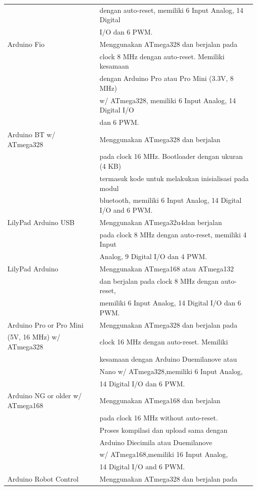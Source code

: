 \begin{table}[!ht]
\begin{tabular}{ |l|l| }
& dengan auto-reset, memiliki 6 Input Analog, 14 Digital \\
& I/O dan 6 PWM.\\
\hline
Arduino Fio & Menggunakan ATmega328 dan berjalan pada \\
& clock 8 MHz dengan auto-reset. Memiliki kesamaan \\ 
& dengan Arduino Pro atau Pro Mini (3.3V, 8 MHz) \\ 
& w/ ATmega328, memiliki 6 Input Analog, 14 Digital I/O \\ 
& dan 6 PWM.\\
\hline
Arduino BT w/ ATmega328 & Menggunakan ATmega328 dan berjalan \\
& pada clock 16 MHz. Bootloader dengan ukuran (4 KB) \\
& termasuk kode untuk melakukan inisialisasi pada modul \\
& bluetooth, memiliki 6 Input Analog, 14 Digital I/O and 6 PWM.\\
\hline
LilyPad Arduino USB & Menggunakan ATmega32u4dan berjalan \\
& pada clock 8 MHz dengan auto-reset, memiliki 4 Input \\
& Analog, 9 Digital I/O dan 4 PWM. \\
\hline
LilyPad Arduino & Menggunakan ATmega168 atau ATmega132 \\
& dan berjalan pada clock 8 MHz dengan auto-reset, \\
&memiliki 6 Input Analog, 14 Digital I/O dan 6 PWM. \\
\hline
Arduino Pro or Pro Mini & Menggunakan ATmega328 dan berjalan pada \\
(5V, 16 MHz) w/ ATmega328 & clock 16 MHz dengan auto-reset. Memiliki \\
 & kesamaan dengan Arduino Duemilanove atau \\
 & Nano w/ ATmega328,memiliki 6 Input Analog,\\
 & 14 Digital I/O dan 6 PWM. \\
\hline
Arduino NG or older w/ ATmega168 & Menggunakan ATmega168 dan berjalan \\
& pada clock 16 MHz without auto-reset. \\
& Proses kompilasi dan upload sama dengan \\
& Arduino Diecimila atau Duemilanove \\
& w/ ATmega168,memiliki 16 Input Analog,\\
& 14 Digital I/O and 6 PWM. \\
\hline
Arduino Robot Control & Menggunakan ATmega328 dan berjalan pada\\

\end{tabular}
\end{table}
